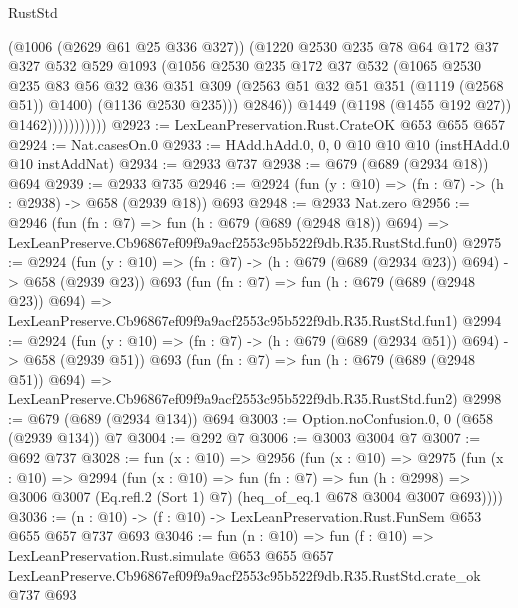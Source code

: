 \begin{lexlean}{RustStd}
\begin{coremodule}
                            (@1006 (@2629 @61 @25 @336 @327))
                            (@1220
                              @2530
                              @235
                              @78
                              @64
                              @172
                              @37
                              @327
                              @532
                              @529
                              @1093
                              (@1056
                                @2530
                                @235
                                @172
                                @37
                                @532
                                (@1065
                                  @2530
                                  @235
                                  @83
                                  @56
                                  @32
                                  @36
                                  @351
                                  @309
                                  (@2563 @51 @32 @51 @351 (@1119 (@2568 @51)) @1400)
                                  (@1136 @2530 @235)))
                              @2846))
                          @1449
                          (@1198 (@1455 @192 @27))
                          @1462)))))))))))
@2923 := LexLeanPreservation.Rust.CrateOK @653 @655 @657
@2924 := Nat.casesOn.{0}
@2933 := HAdd.hAdd.{0, 0, 0} @10 @10 @10 (instHAdd.{0} @10 instAddNat)
@2934 := @2933 @737
@2938 := @679 (@689 (@2934 @18)) @694
@2939 := @2933 @735
@2946 := @2924 (fun (y : @10) => (fn : @7) -> (h : @2938) -> @658 (@2939 @18)) @693
@2948 := @2933 Nat.zero
@2956 := @2946
    (fun (fn : @7) =>
    fun (h : @679 (@689 (@2948 @18)) @694) =>
    LexLeanPreserve.Cb96867ef09f9a9acf2553c95b522f9db.R35.RustStd.fun0)
@2975 := @2924
    (fun (y : @10) => (fn : @7) -> (h : @679 (@689 (@2934 @23)) @694) -> @658 (@2939 @23))
    @693
    (fun (fn : @7) =>
    fun (h : @679 (@689 (@2948 @23)) @694) =>
    LexLeanPreserve.Cb96867ef09f9a9acf2553c95b522f9db.R35.RustStd.fun1)
@2994 := @2924
    (fun (y : @10) => (fn : @7) -> (h : @679 (@689 (@2934 @51)) @694) -> @658 (@2939 @51))
    @693
    (fun (fn : @7) =>
    fun (h : @679 (@689 (@2948 @51)) @694) =>
    LexLeanPreserve.Cb96867ef09f9a9acf2553c95b522f9db.R35.RustStd.fun2)
@2998 := @679 (@689 (@2934 @134)) @694
@3003 := Option.noConfusion.{0, 0} (@658 (@2939 @134)) @7
@3004 := @292 @7
@3006 := @3003 @3004 @7
@3007 := @692 @737
@3028 := fun (x : @10) =>
  @2956
    (fun (x : @10) =>
    @2975
      (fun (x : @10) =>
      @2994
        (fun (x : @10) =>
        fun (fn : @7) =>
        fun (h : @2998) =>
        @3006 @3007 (Eq.refl.{2} (Sort 1) @7) (heq_of_eq.{1} @678 @3004 @3007 @693))))
@3036 := (n : @10) -> (f : @10) -> LexLeanPreservation.Rust.FunSem @653 @655 @657 @737 @693
@3046 := fun (n : @10) =>
  fun (f : @10) =>
  LexLeanPreservation.Rust.simulate
    @653
    @655
    @657
    LexLeanPreserve.Cb96867ef09f9a9acf2553c95b522f9db.R35.RustStd.crate_ok
    @737
    @693
\end{coremodule}
\end{lexlean}
